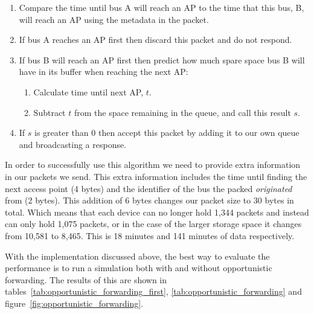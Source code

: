         \begin{enumerate}
            \item Compare the time until bus A will reach an AP to the time that this bus, B, will reach an AP using the metadata in the packet.
            \item If bus A reaches an AP first then discard this packet and do not respond.
            \item If bus B will reach an AP first then predict how much spare space bus B will have in its buffer when reaching the next AP:
                \begin{enumerate}
                    \item Calculate time until next AP, $t$.
                    \item Subtract $t$ from the space remaining in the queue, and call this result $s$.
                \end{enumerate}
            \item If $s$ is greater than 0 then accept this packet by adding it to our own queue and broadcasting a response.
        \end{enumerate}

        In order to successfully use this algorithm we need to provide extra information in our packets we send. This extra information includes the time until finding the next access point (4 bytes) and the identifier of the bus the packed \emph{originated} from (2 bytes). This addition of 6 bytes changes our packet size to 30 bytes in total. Which means that each device can no longer hold 1,344 packets and instead can only hold 1,075 packets, or in the case of the larger storage space it changes from 10,581 to 8,465. This is 18 minutes and 141 minutes of data respectively. 

        With the implementation discussed above, the best way to evaluate the performance is to run a simulation both with and without opportunistic forwarding. The results of this are shown in tables~\ref{tab:opportunistic_forwarding_first}, \ref{tab:opportunistic_forwarding} and figure~\ref{fig:opportunistic_forwarding}.


